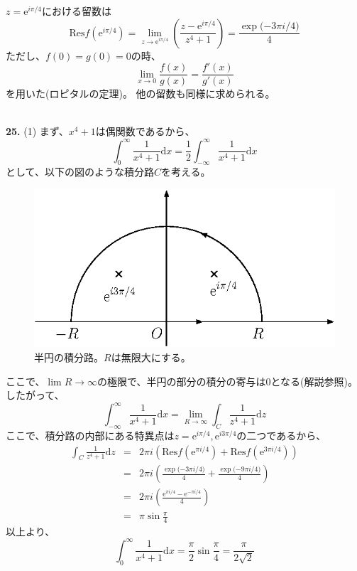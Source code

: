 \documentclass{jarticle}
\newcommand{\diff}{\mathrm d}
\newcommand{\ans}[2]{\noindent\\ {\bf \large #1.} (#2)}
\newcommand{\e}{\mathrm e}
\begin{document}
$z = \e^{i \pi /4}$における留数は
\begin{equation}
  \mbox{Res} f(\e^{i \pi /4}) = \lim_{z \rightarrow \e^{i \pi /4}} \left( \frac{z-\e^{i \pi /4}}{z^4+1} \right)
  = \frac{\exp{(-3\pi i/4})}{4}
\end{equation}
ただし、$f(0)=g(0)=0$の時、
\begin{equation}
  \lim_{x\rightarrow 0} \frac{f(x)}{g(x)} = \frac{f'(x)}{g'(x)}
\end{equation}
を用いた(ロピタルの定理)。
他の留数も同様に求められる。

\ans{25}{1}
まず、$x^4+1$は偶関数であるから、
\begin{equation}
  \int_0^{\infty} \frac{1}{x^4+1} \diff x = \frac{1}{2} \int_{-\infty}^{\infty}  \frac{1}{x^4+1} \diff x
\end{equation}
として、以下の図のような積分路$C$を考える。
\begin{figure}[htbp]
  \begin{center}
    \includegraphics[width=.5\linewidth]{fig/z_int2.eps}
  \end{center}
  \caption{
    半円の積分路。$R$は無限大にする。
  }
  \label{fig_z_int2}
\end{figure}
ここで、$\lim R \rightarrow \infty$の極限で、半円の部分の積分の寄与は$0$となる(解説参照)。
したがって、
\begin{equation}
  \int_{-\infty}^{\infty} \frac{1}{x^4+1} \diff x = \lim_{R \rightarrow \infty} \int_C \frac{1}{z^4+1} \diff z
\end{equation}
ここで、積分路の内部にある特異点は$z = \e^{i\pi/4},\e^{i3\pi/4}$の二つであるから、
\begin{eqnarray}
  \int_C \frac{1}{z^4+1} \diff z &=& 2 \pi i \left( \mbox{Res} f(\e^{\pi i/4}) +\mbox{Res} f(\e^{3\pi i/4})  \right)\\
  &=& 2 \pi i \left(  \frac{\exp{(-3\pi i /4})}{4} + \frac{\exp{(-9 \pi i /4})}{4}  \right)\\
  &=& 2 \pi i \left(  \frac{\e^{\pi i/4}-\e^{- \pi i/4}}{4}  \right)\\
  &=& \pi \sin \frac{\pi}{4}
\end{eqnarray}
以上より、
\begin{equation}
  \int_0^{\infty} \frac{1}{x^4+1} \diff x = \frac{\pi}{2} \sin \frac{\pi}{4} = \frac{\pi}{2\sqrt{2}}
\end{equation}
\end{document}
